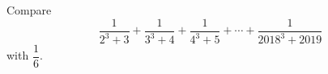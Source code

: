 Compare
\[
\dfrac{1}{2^3+3}+\dfrac{1}{3^3+4}+\dfrac{1}{4^3+5}+\cdots+\dfrac{1}{2018^3+2019}
\]
with $\dfrac{1}{6}$.
